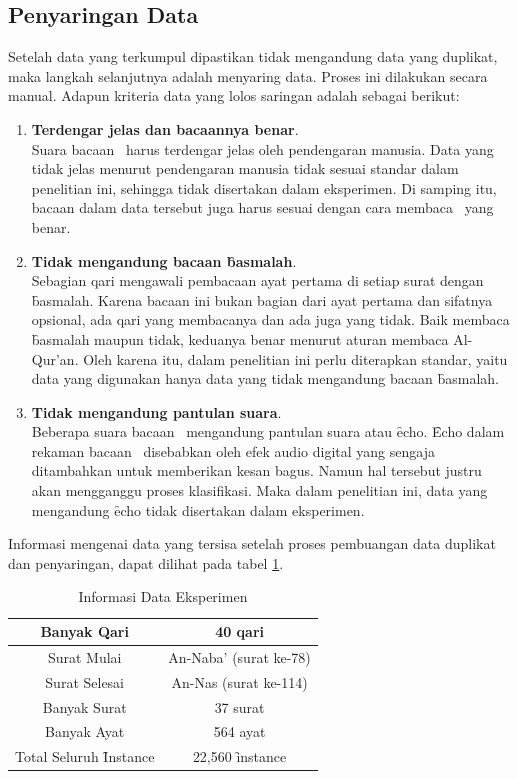   \subsection{Penyaringan Data}
  Setelah data yang terkumpul dipastikan tidak mengandung data yang duplikat, maka langkah selanjutnya adalah menyaring data. Proses ini dilakukan secara manual. Adapun kriteria data yang lolos saringan adalah sebagai berikut:
  \begin{enumerate}
    \item \textbf{Terdengar jelas dan bacaannya benar}.\\
    Suara bacaan \quran~harus terdengar jelas oleh pendengaran manusia. Data yang tidak jelas menurut pendengaran manusia tidak sesuai standar dalam penelitian ini, sehingga tidak disertakan dalam eksperimen. Di samping itu, bacaan dalam data tersebut juga harus sesuai dengan cara membaca \quran~yang benar.

    \item \textbf{Tidak mengandung bacaan \f{basmalah}}.\\
    Sebagian qari mengawali pembacaan ayat pertama di setiap surat dengan \f{basmalah}. Karena bacaan ini bukan bagian dari ayat pertama dan sifatnya opsional, ada qari yang membacanya dan ada juga yang tidak. Baik membaca \f{basmalah} maupun tidak, keduanya benar menurut aturan membaca Al-Qur'an. Oleh karena itu, dalam penelitian ini perlu diterapkan standar, yaitu data yang digunakan hanya data yang tidak mengandung bacaan \f{basmalah}.

    \item \textbf{Tidak mengandung pantulan suara}.\\
    Beberapa suara bacaan \quran~mengandung pantulan suara atau \f{echo}. \f{Echo} dalam rekaman bacaan \quran~disebabkan oleh efek audio digital yang sengaja ditambahkan untuk memberikan kesan bagus. Namun hal tersebut justru akan mengganggu proses klasifikasi. Maka dalam penelitian ini, data yang mengandung \f{echo} tidak disertakan dalam eksperimen.
  \end{enumerate}

  Informasi mengenai data yang tersisa setelah proses pembuangan data duplikat dan penyaringan, dapat dilihat pada tabel \ref{table:data yang tersisa}.
  
  \begin{table}
    \centering
    \caption{Informasi Data Eksperimen}
    \begin{tabular}{|c|c|}
      \hline
      Banyak Qari & 40 qari \\ \hline
      Surat Mulai & An-Naba' (surat ke-78) \\ \hline
      Surat Selesai & An-Nas (surat ke-114) \\ \hline
      Banyak Surat & 37 surat \\ \hline
      Banyak Ayat & 564 ayat \\ \hline
      Total Seluruh \f{Instance} & 22,560 \f{instance} \\ \hline
    \end{tabular}
    \label{table:data yang tersisa}
  \end{table}



